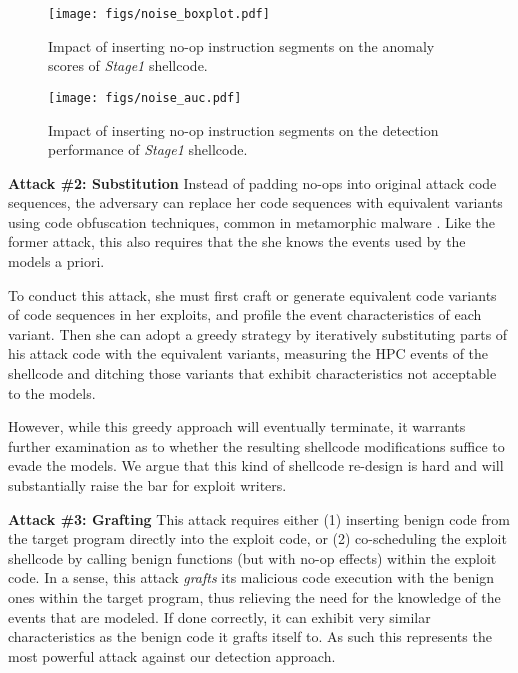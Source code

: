 \documentclass{acm_proc_article-sp}
\begin{document}
\begin{figure}
	  \centering
	  \texttt{[image: figs/noise\_boxplot.pdf]}
 	 \caption{Impact of inserting no-op instruction segments on the anomaly scores of \textit{Stage1} shellcode.}
	 \label{fig:noise_boxplot}
\end{figure}

\begin{figure}
	  \centering
	  \texttt{[image: figs/noise\_auc.pdf]}
 	 \caption{Impact of inserting no-op instruction segments on the detection performance of \textit{Stage1} shellcode.}
	 \label{fig:noise_auc}
\end{figure}

\textbf{Attack \#2: Substitution} \space\space Instead of padding no-ops into original attack code sequences, the adversary can replace her code sequences with equivalent variants using code obfuscation techniques, common in  metamorphic malware \cite{borello:2008}. Like the former attack, this also requires that the she knows the events used by the models a priori.

To conduct this attack, she must first craft or generate equivalent code variants of code sequences in her exploits, and profile the event characteristics of each variant. Then she can adopt a greedy strategy by iteratively substituting parts of his attack code with the equivalent variants, measuring the HPC events of the shellcode and ditching those variants that exhibit characteristics not acceptable to the models.

However, while this greedy approach will eventually terminate, it warrants further examination as to whether the resulting shellcode modifications suffice to evade the models. We argue that this kind of shellcode re-design is hard and will substantially raise the bar for exploit writers.

\textbf{Attack \#3: Grafting} \space\space 
This attack requires either (1) inserting benign code from the 
target program directly into the exploit code, or (2) co-scheduling 
the exploit shellcode by calling benign functions (but with no-op 
effects) within the exploit code. In a sense, this attack 
\textit{grafts} its malicious code execution with the benign ones 
within the target program, thus relieving the need for the knowledge of 
the events that are modeled. If done correctly, it can exhibit very similar 
characteristics as the benign code it grafts itself to. As such this represents 
the most powerful attack against our detection approach.
\end{document}
